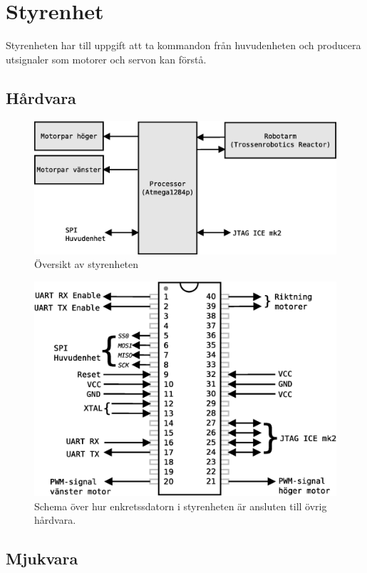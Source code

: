 
\section{Styrenhet}

Styrenheten har till uppgift att ta kommandon från huvudenheten och producera utsignaler som motorer och servon kan förstå.

\subsection{Hårdvara}

\begin{figure}[h!]
	\centering
	\includegraphics[scale=0.4]{grafik/styrenhet-oversikt}
	\caption{Översikt av styrenheten}
\end{figure}

\begin{figure}[h!]
	\centering
	\includegraphics[scale=0.5]{grafik/styrenhet-processor}
	\caption{Schema över hur enkretssdatorn i styrenheten är ansluten till övrig hårdvara.}
\end{figure}

\subsection{Mjukvara}

